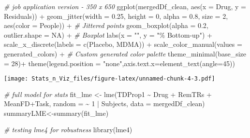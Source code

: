 \documentclass[
]{article}
\newenvironment{Shaded}{\begin{snugshade}}{\end{snugshade}}
\newcommand{\AttributeTok}[1]{\textcolor[rgb]{0.77,0.63,0.00}{#1}}
\newcommand{\CommentTok}[1]{\textcolor[rgb]{0.56,0.35,0.01}{\textit{#1}}}
\newcommand{\ConstantTok}[1]{\textcolor[rgb]{0.00,0.00,0.00}{#1}}
\newcommand{\DecValTok}[1]{\textcolor[rgb]{0.00,0.00,0.81}{#1}}
\newcommand{\FloatTok}[1]{\textcolor[rgb]{0.00,0.00,0.81}{#1}}
\newcommand{\FunctionTok}[1]{\textcolor[rgb]{0.00,0.00,0.00}{#1}}
\newcommand{\NormalTok}[1]{#1}
\newcommand{\OtherTok}[1]{\textcolor[rgb]{0.56,0.35,0.01}{#1}}
\newcommand{\SpecialCharTok}[1]{\textcolor[rgb]{0.00,0.00,0.00}{#1}}
\newcommand{\StringTok}[1]{\textcolor[rgb]{0.31,0.60,0.02}{#1}}
\begin{document}
\begin{Shaded}
\begin{Highlighting}[]
\CommentTok{\# job application version {-} 350 x 650}
\FunctionTok{ggplot}\NormalTok{(mergedDf\_clean, }\FunctionTok{aes}\NormalTok{(}\AttributeTok{x =}\NormalTok{ Drug, }\AttributeTok{y =}\NormalTok{ Residuals)) }\SpecialCharTok{+}
  \FunctionTok{geom\_jitter}\NormalTok{(}\AttributeTok{width =} \FloatTok{0.25}\NormalTok{, }\AttributeTok{height =} \DecValTok{0}\NormalTok{, }\AttributeTok{alpha =} \FloatTok{0.8}\NormalTok{, }\AttributeTok{size =} \DecValTok{2}\NormalTok{, }\FunctionTok{aes}\NormalTok{(}\AttributeTok{color =}\NormalTok{ People)) }\SpecialCharTok{+}  \CommentTok{\# Jittered points}
  \FunctionTok{geom\_boxplot}\NormalTok{(}\AttributeTok{alpha =} \FloatTok{0.2}\NormalTok{, }\AttributeTok{outlier.shape =} \ConstantTok{NA}\NormalTok{) }\SpecialCharTok{+}     \CommentTok{\# Boxplot}
  \FunctionTok{labs}\NormalTok{(}\AttributeTok{x =} \StringTok{""}\NormalTok{,}
       \AttributeTok{y =} \StringTok{"\% Bottom{-}up"}\NormalTok{) }\SpecialCharTok{+}
  \FunctionTok{scale\_x\_discrete}\NormalTok{(}\AttributeTok{labels =} \FunctionTok{c}\NormalTok{(}\StringTok{\textquotesingle{}Placebo\textquotesingle{}}\NormalTok{, }\StringTok{\textquotesingle{}MDMA\textquotesingle{}}\NormalTok{)) }\SpecialCharTok{+}
  \FunctionTok{scale\_color\_manual}\NormalTok{(}\AttributeTok{values =}\NormalTok{ generated\_colors) }\SpecialCharTok{+}  \CommentTok{\# Custom generated color palette}
  \FunctionTok{theme\_minimal}\NormalTok{(}\AttributeTok{base\_size =} \DecValTok{28}\NormalTok{)}\SpecialCharTok{+}
  \FunctionTok{theme}\NormalTok{(}\AttributeTok{legend.position =} \StringTok{"none"}\NormalTok{,}\AttributeTok{axis.text.x=}\FunctionTok{element\_text}\NormalTok{(}\AttributeTok{angle=}\DecValTok{45}\NormalTok{))}
\end{Highlighting}
\end{Shaded}

\texttt{[image: Stats\_n\_Viz\_files/figure-latex/unnamed-chunk-4-3.pdf]}

\begin{Shaded}
\begin{Highlighting}[]
\CommentTok{\# full model for stats}
\NormalTok{fit\_lme }\OtherTok{\textless{}{-}} \FunctionTok{lme}\NormalTok{(TDProp1 }\SpecialCharTok{\textasciitilde{}}\NormalTok{ Drug }\SpecialCharTok{+}\NormalTok{ RemTRs }\SpecialCharTok{+}\NormalTok{ MeanFD}\SpecialCharTok{+}\NormalTok{Task, }\AttributeTok{random =} \SpecialCharTok{\textasciitilde{}} \DecValTok{1} \SpecialCharTok{|}\NormalTok{ Subjects, }\AttributeTok{data =}\NormalTok{ mergedDf\_clean)}
\NormalTok{summaryLME}\OtherTok{\textless{}{-}}\FunctionTok{summary}\NormalTok{(fit\_lme)}

\CommentTok{\# testing lme4 for robustness}
\FunctionTok{library}\NormalTok{(lme4)}
\end{Highlighting}
\end{Shaded}
\end{document}
